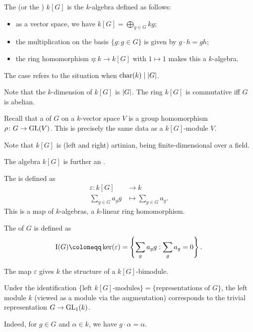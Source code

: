 \documentclass[12pt]{article}
\begin{document}
\begin{defn}
	The  (or the ) $k[G]$ is the $k$-algebra defined as follows:
	\begin{itemize}
		\item as a vector space, we have $k[G] = \bigoplus_{g \in G} kg$;
		\item the multiplication on the basis $\{g : g \in G\}$ is given by $g \cdot h = gh$;
		\item the ring homomorphism $\eta \colon k \to k[G]$ with $1 \mapsto 1$ makes this a $k$-algebra.
	\end{itemize}

	The  case refers to the situation when $\operatorname{char}(k) \mid {\left\lvert G \right\lvert}$.
\end{defn}
Note that the $k$-dimension of $k[G]$ is ${\left\lvert G \right\lvert}$. 
The ring $k[G]$ is commutative iff $G$ is abelian.

Recall that a  of $G$ on a $k$-vector space $V$ is a group homomorphism $\rho \colon G \to \operatorname{GL}(V)$. 
This is precisely the same data as a $k[G]$-module $V$. 

Note that $k[G]$ is (left and right) artinian, being finite-dimensional over a field. 

\begin{defn}
	The algebra $k[G]$ is further an .

	The  is defined as
	\begin{align*} 
		\varepsilon \colon k[G] & \to k \\
		\sum_{g \in G} a_{g} g & \mapsto \sum_{g \in G} a_{g}.
	\end{align*}
	This is a map of $k$-algebras, a $k$-linear ring homomorphism.

	The  of $G$ is defined as
	\begin{equation*} 
		\II(G) \coloneqq \ker(\varepsilon) = \left\{\sum_{g} a_{g} g : \sum_{g} a_{g} = 0\right\}.
	\end{equation*}
\end{defn}

\begin{defn}
	The map $\varepsilon$ gives $k$ the structure of a $k[G]$-bimodule.
\end{defn}

\begin{rem}
	Under the identification $\{\text{left $k[G]$-modules}\} = \{\text{representations of $G$}\}$, 
	the left module $k$ (viewed as a module via the augmentation) corresponds to the 
	trivial representation $G \to \operatorname{GL}_{1}(k)$. 

	Indeed, for $g \in G$ and $\alpha \in k$, we have $g \cdot \alpha = \alpha$.
\end{rem}
\end{document}
